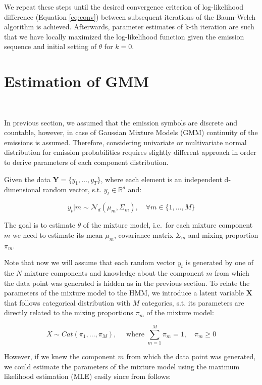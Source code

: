 We repeat these steps until the desired convergence criterion of log-likelihood difference (Equation \ref{eq:conv}) between subsequent iterations of the Baum-Welch algorithm 
is achieved. Afterwards, parameter estimates of k-th iteration are such that we have locally maximized the log-likelihood function given the emission sequence 
and initial setting of $\theta$ for $k=0$.

\section{Estimation of GMM}~\label{sec:EM-GMM}

In previous section, we assumed that the emission symbols are discrete and countable, however, in case of Gaussian Mixture Models (GMM) continuity of the emissions 
is assumed. Therefore, considering univariate or multivariate normal distribution for emission probabilities requires slightly different approach in order to derive parameters
of each component distribution.

Given the data $\textbf{Y} = \{y_1,\ldots,y_T\}$, where each element is an independent  
d-dimensional random vector, s.t. $y_t \in \mathbb{R}^d$ and:

\begin{equation}
    y_t|m \sim \mathcal{N}_d(\mu_m, \Sigma_m), \quad \forall m \in \{1,\ldots,M\} 
\end{equation}

The goal is to estimate $\theta$ of the mixture model, i.e.\ for each mixture component $m$ we need to estimate its mean $\mu_m$, 
covariance matrix $\Sigma_m$ and mixing proportion $\pi_m$.~\citep{Bishop2006} 

Note that now we will assume that each random vector $y_t$ is generated by one of the $N$ mixture components and knowledge about the component $m$ from which the data point was generated is 
hidden as in the previous section. To relate the parameters of the mixture model to the HMM, we introduce a latent variable $\textbf{X}$ that follows categorical distribution with $M$ categories, s.t. 
its parameters are directly related to the mixing proportions $\pi_m$ of the mixture model:

\begin{equation}
    X \sim Cat(\pi_1,\ldots,\pi_M) , \quad \textrm{ where } \sum_{m=1}^{M} \pi_m = 1, \quad \pi_m \geq 0
\end{equation}

However, if we knew the component $m$ from which the data point was generated, we could estimate the parameters of the mixture model using the 
maximum likelihood estimation (MLE) easily since from \citep{Davenport1988} follows:

